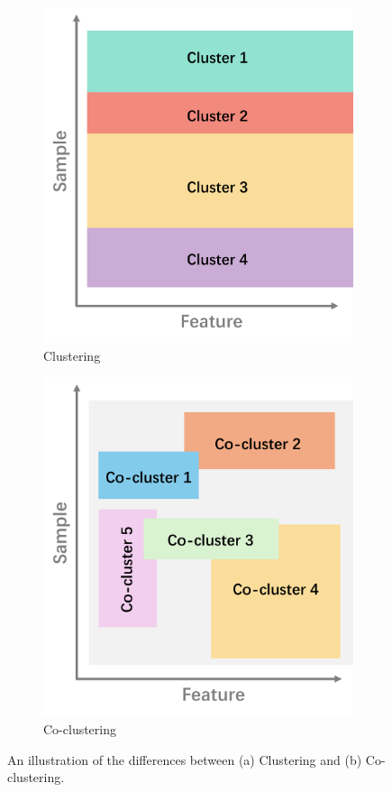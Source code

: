 \documentclass[journal]{IEEEtran}
\begin{document}
\begin{figure}[t]
  \centering
  \begin{subfigure}[b]{0.22\textwidth}
    \includegraphics[width=\linewidth]{cluster.png}
    \caption{Clustering}
    \label{fig:cluster}
  \end{subfigure}
  \hfill
  \begin{subfigure}[b]{0.22\textwidth}
    \includegraphics[width=\linewidth]{coc.png}
    \caption{Co-clustering}
    \label{fig:cocluster}
  \end{subfigure}
  \caption{An illustration of the differences between (a) Clustering and (b) Co-clustering.}
  \label{fig:cocomparison}
\end{figure}
\end{document}
